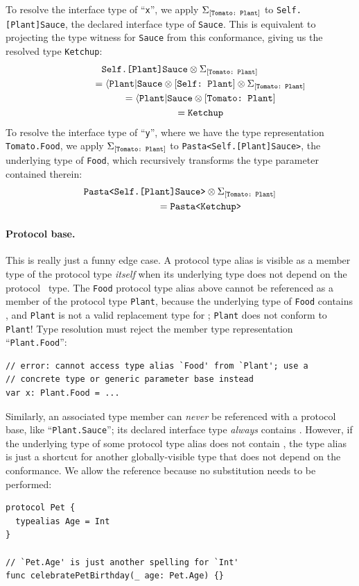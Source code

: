 \documentclass[../generics]{subfiles}
\begin{document}
To resolve the interface type of ``\texttt{x}'', we apply $\Sigma_{[\texttt{Tomato:~Plant}]}$ to \texttt{Self.[Plant]Sauce}, the declared interface type of \texttt{Sauce}. This is equivalent to projecting the type witness for \texttt{Sauce} from this conformance, giving us the resolved type \texttt{Ketchup}:
\begin{gather*}
\texttt{Self.[Plant]Sauce} \otimes \Sigma_{[\texttt{Tomato:~Plant}]}\\
\qquad\qquad {} = \langle\texttt{Plant}|\texttt{Sauce} \otimes [\texttt{Self:~Plant}] \otimes \Sigma_{[\texttt{Tomato:~Plant}]}\\
\qquad\qquad {} = \langle\texttt{Plant}|\texttt{Sauce} \otimes [\texttt{Tomato:~Plant}]\\
\qquad\qquad {} = \texttt{Ketchup}
\end{gather*}
To resolve the interface type of ``\texttt{y}'', where we have the type representation \texttt{Tomato.Food}, we apply $\Sigma_{[\texttt{Tomato:~Plant}]}$ to \texttt{Pasta<Self.[Plant]Sauce>}, the underlying type of \texttt{Food}, which recursively transforms the type parameter contained therein:
\begin{gather*}
\texttt{Pasta<Self.[Plant]Sauce>} \otimes \Sigma_{[\texttt{Tomato:~Plant}]}\\
\qquad\qquad {} = \texttt{Pasta<Ketchup>}
\end{gather*}

\paragraph{Protocol base.} This is really just a funny edge case. A protocol type alias is visible as a member type of the protocol type \emph{itself} when its underlying type does not depend on the \IndexSelf protocol \tSelf\ type. The \texttt{Food} protocol type alias above cannot be referenced as a member of the protocol type \texttt{Plant}, because the underlying type of \texttt{Food} contains \tSelf, and \texttt{Plant} is not a valid replacement type for \tSelf; \texttt{Plant} does not conform to \texttt{Plant}! Type resolution must reject the member type representation ``\texttt{Plant.Food}'':
\begin{Verbatim}
// error: cannot access type alias `Food' from `Plant'; use a
// concrete type or generic parameter base instead
var x: Plant.Food = ...
\end{Verbatim}
Similarly, an associated type member can \emph{never} be referenced with a protocol base, like ``\texttt{Plant.Sauce}''; its declared interface type \emph{always} contains \tSelf. However, if the underlying type of some protocol type alias does not contain \tSelf, the type alias is just a shortcut for another globally-visible type that does not depend on the conformance. We allow the reference because no substitution needs to be performed:
\begin{Verbatim}
protocol Pet {
  typealias Age = Int
}

// `Pet.Age' is just another spelling for `Int'
func celebratePetBirthday(_ age: Pet.Age) {}
\end{Verbatim}
\end{document}
